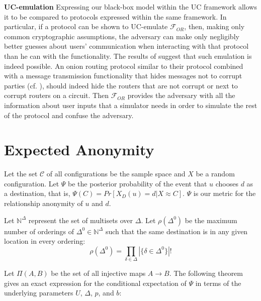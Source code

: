 \documentclass[prodmode,acmtissec]{acmsmall}
\begin{document}
{\bf UC-emulation}
Expressing our black-box model within the UC framework allows it to be compared to protocols expressed within the same framework. In particular, if a protocol can be shown to UC-emulate $\mathcal{F}_{OR}$, then, making only common cryptographic assumptions, the adversary can make only negligibly better guesses about users' communication when interacting with that protocol than he can with the functionality. The results of  suggest that such emulation is indeed possible. An onion routing protocol similar to their protocol combined with a message transmission functionality that hides messages not to corrupt parties (cf. ), should indeed hide the routers that are not corrupt or next to corrupt routers on a circuit. Then $\mathcal{F}_{OR}$ provides the adversary with all the information about user inputs that a simulator needs in order to simulate the rest of the protocol and confuse the adversary.

\section{Expected Anonymity} \label{sec:expanon}
Let the set $\mathcal{C}$ of all configurations be the sample space and $X$ be a random configuration. Let $\Psi$ be the posterior probability of the event that $u$ chooses $d$ as a destination, that is, $\Psi(C) = Pr[X_D(u)=d | X\approx C]$.  $\Psi$ is our metric for the relationship anonymity of $u$ and $d$.

Let $\mathbb{N}^{\Delta}$ represent the set of multisets over $\Delta$.  Let $\rho(\Delta^0)$ be the maximum number of orderings of $\Delta^0 \in \mathbb{N}^{\Delta}$ such that the same destination is in any given location in every ordering:
\begin{equation*}
\rho(\Delta^0) = \prod_{\delta \in \Delta} |\{\delta \in \Delta^0\}|!
\end{equation*}

Let $\Pi(A,B)$ be the set of all injective maps $A\rightarrow B$.  The following theorem gives an exact expression for the conditional expectation of $\Psi$ in terms of the underlying parameters $U$, $\Delta$, $p$, and $b$:
\end{document}

